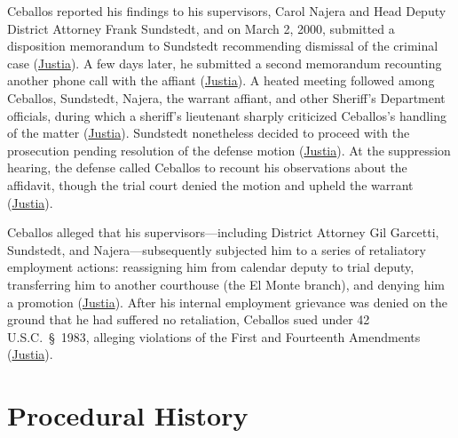 \documentclass[12pt]{article}
\begin{document}
Ceballos reported his findings to his supervisors, Carol Najera and Head Deputy District Attorney Frank Sundstedt, and on March 2, 2000, submitted a disposition memorandum to Sundstedt recommending dismissal of the criminal case (\href{https://supreme.justia.com/cases/federal/us/547/410/}{Justia}). A few days later, he submitted a second memorandum recounting another phone call with the affiant (\href{https://supreme.justia.com/cases/federal/us/547/410/}{Justia}). A heated meeting followed among Ceballos, Sundstedt, Najera, the warrant affiant, and other Sheriff's Department officials, during which a sheriff's lieutenant sharply criticized Ceballos's handling of the matter (\href{https://supreme.justia.com/cases/federal/us/547/410/}{Justia}). Sundstedt nonetheless decided to proceed with the prosecution pending resolution of the defense motion (\href{https://supreme.justia.com/cases/federal/us/547/410/}{Justia}). At the suppression hearing, the defense called Ceballos to recount his observations about the affidavit, though the trial court denied the motion and upheld the warrant (\href{https://supreme.justia.com/cases/federal/us/547/410/}{Justia}).

Ceballos alleged that his supervisors---including District Attorney Gil Garcetti, Sundstedt, and Najera---subsequently subjected him to a series of retaliatory employment actions: reassigning him from calendar deputy to trial deputy, transferring him to another courthouse (the El Monte branch), and denying him a promotion (\href{https://supreme.justia.com/cases/federal/us/547/410/}{Justia}). After his internal employment grievance was denied on the ground that he had suffered no retaliation, Ceballos sued under 42 U.S.C.\ \S~1983, alleging violations of the First and Fourteenth Amendments (\href{https://supreme.justia.com/cases/federal/us/547/410/}{Justia}).

\section{Procedural History}
\end{document}
